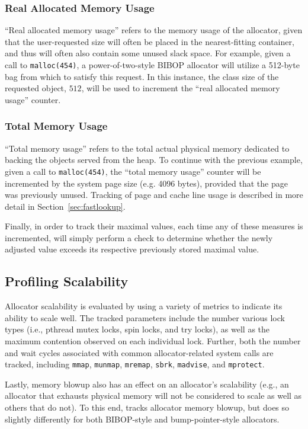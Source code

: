 \subsubsection{Real Allocated Memory Usage}
``Real allocated memory usage'' refers to the memory usage of the allocator, given that the user-requested size will often be placed in the nearest-fitting container, and thus will often also contain some unused slack space. For example, given a call to \texttt{malloc(454)}, a power-of-two-style BIBOP allocator will utilize a 512-byte bag from which to satisfy this request. In this instance, the class size of the requested object, $512$, will be used to increment the ``real allocated memory usage'' counter.

\subsubsection{Total Memory Usage}
``Total memory usage'' refers to the total actual physical memory dedicated to backing the objects served from the heap. To continue with the previous example, given a call to \texttt{malloc(454)}, the ``total memory usage'' counter will be incremented by the system page size (e.g. 4096 bytes), provided that the page was previously unused. Tracking of page and cache line usage is described in more detail in Section~\ref{sec:fastlookup}.

Finally, in order to track their maximal values, each time any of these measures is incremented, \MP{} will simply perform a check to determine whether the newly adjusted value exceeds its respective previously stored maximal value.

\subsection{Profiling Scalability}
Allocator scalability is evaluated by \MP{} using a variety of metrics to indicate its ability to scale well. The tracked parameters include the number various lock types (i.e., pthread mutex locks, spin locks, and try locks), as well as the maximum contention observed on each individual lock.
Further, both the number and wait cycles associated with common allocator-related system calls are tracked, including \texttt{mmap}, \texttt{munmap}, \texttt{mremap}, \texttt{sbrk}, \texttt{madvise}, and \texttt{mprotect}.

Lastly, memory blowup also has an effect on an allocator's scalability (e.g., an allocator that exhausts physical memory will not be considered to scale as well as others that do not). To this end, \MP{} tracks allocator memory blowup, but does so slightly differently for both BIBOP-style and bump-pointer-style allocators.

